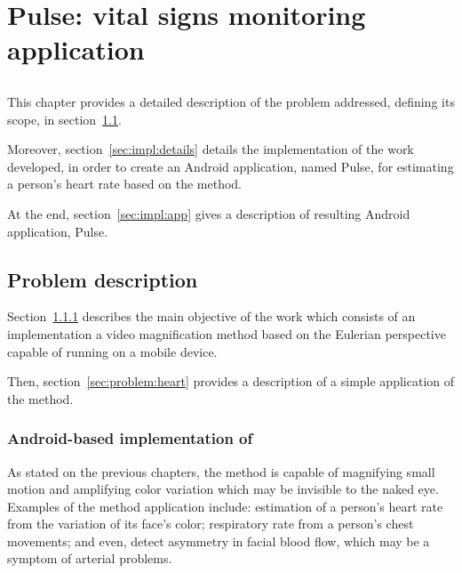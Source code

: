 \chapter{Pulse: vital signs monitoring application} \label{chap:impl}

\section*{}



This chapter provides a detailed description of the problem addressed, defining
its scope, in section~\ref{sec:impl:problem}.

Moreover, section~\ref{sec:impl:details} details the implementation of the
work developed,
in order to create an Android application, named Pulse, for estimating a
person's heart rate based on the \evm{} method.

At the end, section~\ref{sec:impl:app} gives a description of resulting
Android application, Pulse.

\section{Problem description} \label{sec:impl:problem}

Section~\ref{sec:problem:evm} describes the main objective of the work which
consists of an implementation a video magnification method based on the
Eulerian perspective capable of running on a mobile device.

Then, section~\ref{sec:problem:heart} provides a description of a simple
application of the \evm{} method.

\subsection{Android-based implementation of \evm} \label{sec:problem:evm}

As stated on the previous chapters,
the \evm{} method is capable of magnifying small
motion and amplifying color variation which may be invisible to the naked eye.
Examples of the method application include:
estimation of a person's heart rate from the variation of its face's color;
respiratory rate from a person's chest movements;
and even, detect asymmetry in facial blood flow, which may be a symptom of
arterial problems.

